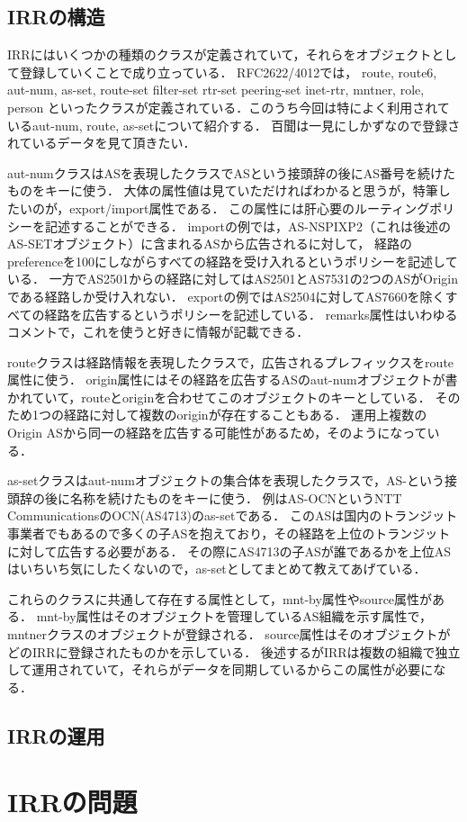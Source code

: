 \subsection{IRRの構造}

IRRにはいくつかの種類のクラスが定義されていて，それらをオブジェクトとして登録していくことで成り立っている．
RFC2622/4012では，
route, route6, aut-num, as-set, route-set filter-set rtr-set peering-set inet-rtr, mntner, role, person
といったクラスが定義されている．このうち今回は特によく利用されているaut-num, route, as-setについて紹介する．
百聞は一見にしかずなので登録されているデータを見て頂きたい．

aut-numクラスはASを表現したクラスでASという接頭辞の後にAS番号を続けたものをキーに使う．
大体の属性値は見ていただければわかると思うが，特筆したいのが，export/import属性である．
この属性には肝心要のルーティングポリシーを記述することができる．
importの例では，AS-NSPIXP2（これは後述のAS-SETオブジェクト）に含まれるASから広告されるに対して，
経路のpreferenceを100にしながらすべての経路を受け入れるというポリシーを記述している．
一方でAS2501からの経路に対してはAS2501とAS7531の2つのASがOriginである経路しか受け入れない．
exportの例ではAS2504に対してAS7660を除くすべての経路を広告するというポリシーを記述している．
remarks属性はいわゆるコメントで，これを使うと好きに情報が記載できる．

routeクラスは経路情報を表現したクラスで，広告されるプレフィックスをroute属性に使う．
origin属性にはその経路を広告するASのaut-numオブジェクトが書かれていて，routeとoriginを合わせてこのオブジェクトのキーとしている．
そのため1つの経路に対して複数のoriginが存在することもある．
運用上複数のOrigin ASから同一の経路を広告する可能性があるため，そのようになっている．

as-setクラスはaut-numオブジェクトの集合体を表現したクラスで，AS-という接頭辞の後に名称を続けたものをキーに使う．
例はAS-OCNというNTT CommunicationsのOCN(AS4713)のas-setである．
このASは国内のトランジット事業者でもあるので多くの子ASを抱えており，その経路を上位のトランジットに対して広告する必要がある．
その際にAS4713の子ASが誰であるかを上位ASはいちいち気にしたくないので，as-setとしてまとめて教えてあげている．

これらのクラスに共通して存在する属性として，mnt-by属性やsource属性がある．
mnt-by属性はそのオブジェクトを管理しているAS組織を示す属性で，mntnerクラスのオブジェクトが登録される．
source属性はそのオブジェクトがどのIRRに登録されたものかを示している．
後述するがIRRは複数の組織で独立して運用されていて，それらがデータを同期しているからこの属性が必要になる．

\subsection{IRRの運用}

\section{IRRの問題}


